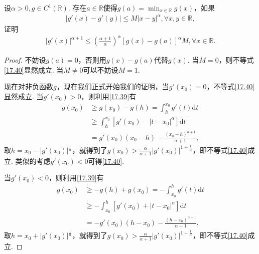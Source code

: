 \documentclass[../../main.tex]{subfiles}
\begin{document}
\begin{lemma}\label{lemma:g'(x)的Hölder连续相关结论}
设$\alpha>0, g\in C^1(\mathbb{R})$. 存在$a\in\mathbb{R}$使得$g(a)=\min_{x\in\mathbb{R}}g(x)$，如果
\begin{align}
|g'(x) - g'(y)| \leqslant M|x - y|^{\alpha}, \forall x,y\in\mathbb{R}, \label{17.39}
\end{align}
证明
\begin{align}
|g'(x)|^{\alpha + 1} \leqslant \left(\frac{\alpha + 1}{\alpha}\right)^{\alpha}[g(x) - g(a)]^{\alpha}M, \forall x\in\mathbb{R}. \label{17.40}
\end{align}
\end{lemma}
\begin{proof}
不妨设$g(a)=0$，否则用$g(x) - g(a)$代替$g(x)$. 当$M = 0$，则不等式\eqref{17.40}显然成立. 当$M\neq0$可以不妨设$M = 1$.

现在对非负函数$g$，现在我们正式开始我们的证明，当$g'(x_0)=0$，不等式\eqref{17.40}显然成立. 当$g'(x_0)>0$，则利用\eqref{17.39}有
\begin{align*}
g(x_0) &\geqslant g(x_0) - g(h)=\int_{h}^{x_0}g'(t)\mathrm{d}t \\
&\geqslant \int_{h}^{x_0}[g'(x_0) - |t - x_0|^{\alpha}]\mathrm{d}t \\
&= g'(x_0)(x_0 - h)-\frac{(x_0 - h)^{\alpha + 1}}{\alpha + 1},
\end{align*}
取$h = x_0 - |g'(x_0)|^{\frac{1}{\alpha}}$，就得到了$g(x_0)>\frac{\alpha}{\alpha + 1}|g'(x_0)|^{1 + \frac{1}{\alpha}}$，即不等式\eqref{17.40}成立. 类似的考虑$g'(x_0)<0$可得\eqref{17.40}.

当$g'(x_0)<0$，则利用\eqref{17.39}有
\begin{align*}
g(x_0) &\geqslant -g(h) + g(x_0)=-\int_{x_0}^{h}g'(t)\mathrm{d}t \\
&\geqslant -\int_{x_0}^{h}[g'(x_0) + |t - x_0|^{\alpha}]\mathrm{d}t \\
&= -g'(x_0)(h - x_0)-\frac{(h - x_0)^{\alpha + 1}}{\alpha + 1},
\end{align*}
取$h = x_0 + |g'(x_0)|^{\frac{1}{\alpha}}$，就得到了$g(x_0)>\frac{\alpha}{\alpha + 1}|g'(x_0)|^{1 + \frac{1}{\alpha}}$，即不等式\eqref{17.40}成立. 
\end{proof}
\end{document}
